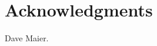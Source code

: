 \documentclass{sig-alternate}
\begin{document}
\section{Acknowledgments}
Dave Maier.
%

%
%
\end{document}
